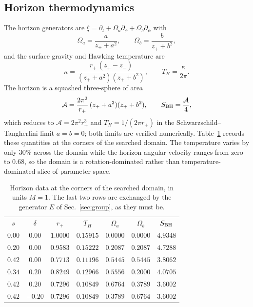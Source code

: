 \documentclass[aps,prd,reprint,superscriptaddress,nofootinbib,longbibliography]{revtex4-2}
\theoremstyle{plain}
\theoremstyle{definition}
\theoremstyle{remark}
\begin{document}
\subsection{Horizon thermodynamics}\label{sec:bg:thermo}

The horizon generators are $\xi=\partial_t+\Omega_a\partial_\phi
+\Omega_b\partial_\psi$ with
\begin{equation}\label{eq:horizondata}
  \Omega_a = \frac{a}{z_++a^2},\qquad
  \Omega_b = \frac{b}{z_++b^2},
\end{equation}
and the surface gravity and Hawking temperature are
\begin{equation}\label{eq:kappa}
  \kappa = \frac{r_+\,(z_+-z_-)}{(z_++a^2)(z_++b^2)},
  \qquad T_H = \frac{\kappa}{2\pi}.
\end{equation}
The horizon is a squashed three-sphere of area
\begin{equation}\label{eq:area}
  \mathcal{A} = \frac{2\pi^2}{r_+}\,(z_++a^2)(z_++b^2),
  \qquad S_{\rm BH}=\frac{\mathcal{A}}{4},
\end{equation}
which reduces to $\mathcal{A}=2\pi^2r_+^3$ and $T_H=1/(2\pi r_+)$ in the
Schwarzschild--Tangherlini limit $a=b=0$; both limits are verified numerically.
Table~\ref{tab:thermo} records these quantities at the corners of the searched
domain. The temperature varies by only $30\%$ across the domain while the
horizon angular velocity ranges from zero to $0.68$, so the domain is a
rotation-dominated rather than temperature-dominated slice of parameter space.

\begin{table}[t]
\centering
\begin{ruledtabular}
\begin{tabular}{ccccccc}
$s$ & $\delta$ & $r_+$ & $T_H$ & $\Omega_a$ & $\Omega_b$ & $S_{\rm BH}$ \\
\colrule
$0.00$ & $0.00$  & $1.0000$ & $0.15915$ & $0.0000$ & $0.0000$ & $4.9348$ \\
$0.20$ & $0.00$  & $0.9583$ & $0.15222$ & $0.2087$ & $0.2087$ & $4.7288$ \\
$0.42$ & $0.00$  & $0.7713$ & $0.11196$ & $0.5445$ & $0.5445$ & $3.8062$ \\
$0.34$ & $0.20$  & $0.8249$ & $0.12966$ & $0.5556$ & $0.2000$ & $4.0705$ \\
$0.42$ & $0.20$  & $0.7296$ & $0.10849$ & $0.6764$ & $0.3789$ & $3.6002$ \\
$0.42$ & $-0.20$ & $0.7296$ & $0.10849$ & $0.3789$ & $0.6764$ & $3.6002$ \\
\end{tabular}
\end{ruledtabular}
\caption{Horizon data at the corners of the searched domain, in units $M=1$.
The last two rows are exchanged by the generator $E$ of
Sec.~\ref{sec:group}, as they must be.}
\label{tab:thermo}
\end{table}
\end{document}
